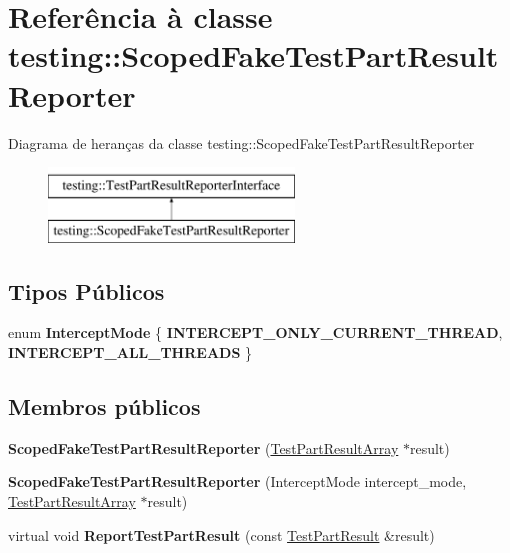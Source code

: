 \hypertarget{classtesting_1_1ScopedFakeTestPartResultReporter}{\section{Referência à classe testing\-:\-:Scoped\-Fake\-Test\-Part\-Result\-Reporter}
\label{classtesting_1_1ScopedFakeTestPartResultReporter}
}
Diagrama de heranças da classe testing\-:\-:Scoped\-Fake\-Test\-Part\-Result\-Reporter\begin{figure}[H]
\begin{center}
\leavevmode
\includegraphics[height=2.000000cm]{classtesting_1_1ScopedFakeTestPartResultReporter}
\end{center}
\end{figure}
\subsection*{Tipos Públicos}
\begin{DoxyCompactItemize}
\item 
enum {\bfseries Intercept\-Mode} \{ {\bfseries I\-N\-T\-E\-R\-C\-E\-P\-T\-\_\-\-O\-N\-L\-Y\-\_\-\-C\-U\-R\-R\-E\-N\-T\-\_\-\-T\-H\-R\-E\-A\-D}, 
{\bfseries I\-N\-T\-E\-R\-C\-E\-P\-T\-\_\-\-A\-L\-L\-\_\-\-T\-H\-R\-E\-A\-D\-S}
 \}
\end{DoxyCompactItemize}
\subsection*{Membros públicos}
\begin{DoxyCompactItemize}
\item 
\hypertarget{classtesting_1_1ScopedFakeTestPartResultReporter_aa0100ecf4799fb51d45167be6a5de1d5}{{\bfseries Scoped\-Fake\-Test\-Part\-Result\-Reporter} (\hyperlink{classtesting_1_1TestPartResultArray}{Test\-Part\-Result\-Array} $\ast$result)}\label{classtesting_1_1ScopedFakeTestPartResultReporter_aa0100ecf4799fb51d45167be6a5de1d5}

\item 
\hypertarget{classtesting_1_1ScopedFakeTestPartResultReporter_a57cbc09ed48627c8a73e622618dc4b4f}{{\bfseries Scoped\-Fake\-Test\-Part\-Result\-Reporter} (Intercept\-Mode intercept\-\_\-mode, \hyperlink{classtesting_1_1TestPartResultArray}{Test\-Part\-Result\-Array} $\ast$result)}\label{classtesting_1_1ScopedFakeTestPartResultReporter_a57cbc09ed48627c8a73e622618dc4b4f}

\item 
\hypertarget{classtesting_1_1ScopedFakeTestPartResultReporter_a82531434f51632d98ed7cdcdb10b8b92}{virtual void {\bfseries Report\-Test\-Part\-Result} (const \hyperlink{classtesting_1_1TestPartResult}{Test\-Part\-Result} \&result)}\label{classtesting_1_1ScopedFakeTestPartResultReporter_a82531434f51632d98ed7cdcdb10b8b92}

\end{DoxyCompactItemize}


